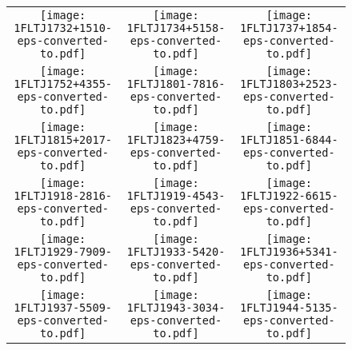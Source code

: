 \begin{figure}[!t]
	\centering            
	\ContinuedFloat 
\setlength\tabcolsep{0.0pt}
\begin{tabular}{ccc}
  \texttt{[image: 1FLTJ1732+1510-eps-converted-to.pdf]}\label{fig:1FLTJ1732+1510}&
  \texttt{[image: 1FLTJ1734+5158-eps-converted-to.pdf]}\label{fig:1FLTJ1734+5158}&
  \texttt{[image: 1FLTJ1737+1854-eps-converted-to.pdf]}\label{fig:1FLTJ1737+1854}\\
  \texttt{[image: 1FLTJ1752+4355-eps-converted-to.pdf]}\label{fig:1FLTJ1752+4355}& 
  \texttt{[image: 1FLTJ1801-7816-eps-converted-to.pdf]}\label{fig:1FLTJ1801-7816}&
  \texttt{[image: 1FLTJ1803+2523-eps-converted-to.pdf]}\label{fig:1FLTJ1803+2523}\\
  \texttt{[image: 1FLTJ1815+2017-eps-converted-to.pdf]}\label{fig:1FLTJ1815+2017}&
  \texttt{[image: 1FLTJ1823+4759-eps-converted-to.pdf]}\label{fig:1FLTJ1823+4759}&
  \texttt{[image: 1FLTJ1851-6844-eps-converted-to.pdf]}\label{fig:1FLTJ1851-6844}\\
  \texttt{[image: 1FLTJ1918-2816-eps-converted-to.pdf]}\label{fig:1FLTJ1918-2816}&
  \texttt{[image: 1FLTJ1919-4543-eps-converted-to.pdf]}\label{fig:1FLTJ1919-4543}&
  \texttt{[image: 1FLTJ1922-6615-eps-converted-to.pdf]}\label{fig:1FLTJ1922-6615}\\
  \texttt{[image: 1FLTJ1929-7909-eps-converted-to.pdf]}\label{fig:1FLTJ1929-7909}&
  \texttt{[image: 1FLTJ1933-5420-eps-converted-to.pdf]}\label{fig:1FLTJ1933-5420}&
  \texttt{[image: 1FLTJ1936+5341-eps-converted-to.pdf]}\label{fig:1FLTJ1936+5341}\\
  \texttt{[image: 1FLTJ1937-5509-eps-converted-to.pdf]}\label{fig:1FLTJ1937-5509}&
  \texttt{[image: 1FLTJ1943-3034-eps-converted-to.pdf]}\label{fig:1FLTJ1943-3034}&
  \texttt{[image: 1FLTJ1944-5135-eps-converted-to.pdf]}\label{fig:1FLTJ1944-5135}\\
\end{tabular}
\end{figure}
